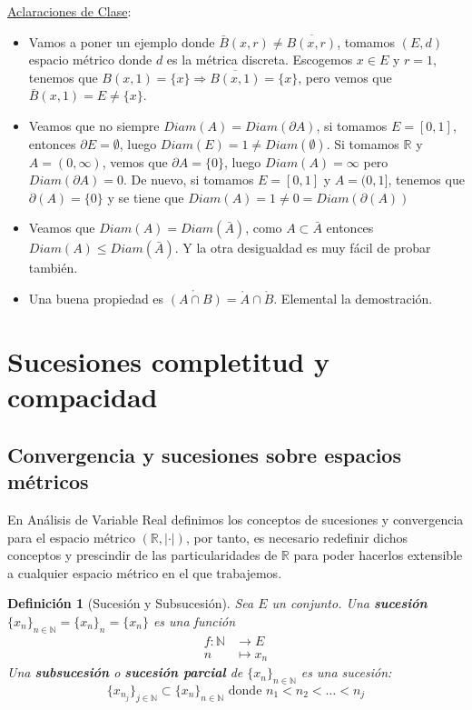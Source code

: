 \documentclass[10pt,a4paper,openright]{book}
\theoremstyle{break}
\newtheorem*{defi}{Definición}
\begin{document}
\underline{Aclaraciones de Clase}:
\begin{itemize}
\item Vamos a poner un ejemplo donde $\bar{B}(x,r)\neq \overline{B(x,r)}$, tomamos $(E,d)$ espacio métrico donde $d$ es la métrica discreta. Escogemos $x\in E$ y $r=1$, tenemos que $B(x,1)=\{x\}\Rightarrow \overline{B(x,1)} = \{x\}$, pero vemos que $\bar{B}(x,1) = E \neq \{x\}$.

\item Veamos que no siempre $Diam(A) = Diam (\partial A)$, si tomamos $E=[0,1]$, entonces $\partial E = \emptyset$, luego $Diam (E) =1\neq Diam(\emptyset)$. Si tomamos $\mathbb{R}$ y $A=(0,\infty)$, vemos que $\partial A =\{0\}$, luego $Diam(A) = \infty$ pero $Diam (\partial A) = 0$. De nuevo, si tomamos $E=[0,1]$ y $A=(0,1]$, tenemos que $\partial(A) = \{0\}$ y se tiene que $Diam(A) = 1 \neq 0 = Diam (\partial(A))$

\item Veamos que $Diam(A) = Diam (\bar{A})$, como $A\subset \bar{A}$ entonces $Diam(A) \leq Diam (\bar{A})$. Y la otra desigualdad es muy fácil de probar también.

\item Una buena propiedad es $\mathring{(A\cap B)} = \mathring{A} \cap \mathring{B}$. Elemental la demostración.
\end{itemize}

\section{Sucesiones completitud y compacidad}
\subsection{Convergencia y sucesiones sobre espacios métricos}
En Análisis de Variable Real definimos los conceptos de sucesiones y convergencia para el espacio métrico $(\mathbb{R}, |\cdot|)$, por tanto, es necesario redefinir dichos conceptos y prescindir de las particularidades de $\mathbb{R}$ para poder hacerlos extensible a cualquier espacio métrico en el que trabajemos.

\begin{defi}[Sucesión y Subsucesión]
Sea $E$ un conjunto. Una \textbf{sucesión} $\{x_n\}_{n \in \mathbb{N}} = \{x_n\}_n = \{x_n\}$ es una función 
\begin{align*}
f : \mathbb{N} &\to E \\ n &\mapsto x_n
\end{align*}
Una \textbf{subsucesión} o \textbf{sucesión parcial} de $\{x_n\}_{n \in \mathbb{N}}$ es una sucesión:
$$\{x_{n_j}\}_{j \in \mathbb{N}} \subset \{x_n\}_{n \in \mathbb{N}} \mbox{ donde } n_1 < n_2 < \ldots < n_j$$
\end{defi}
\newpage
\end{document}
